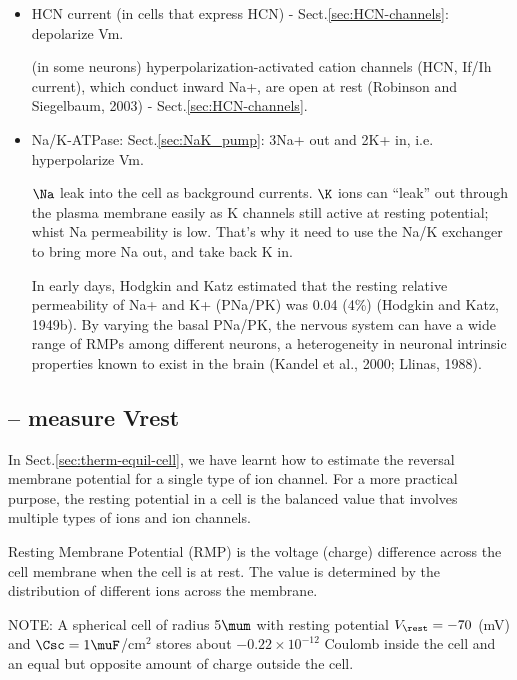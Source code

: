 \begin{itemize}
  \item HCN current (in cells that express HCN) - Sect.\ref{sec:HCN-channels}:
  depolarize Vm.

(in some neurons) hyperpolarization-activated cation channels (HCN,
If/Ih current), which conduct inward Na+, are open at rest (Robinson and
Siegelbaum, 2003) - Sect.\ref{sec:HCN-channels}.
  
  \item Na/K-ATPase: Sect.\ref{sec:NaK_pump}: 3Na+ out and 2K+ in, i.e.
  hyperpolarize Vm.

  
  $\Na$ leak into the cell as background currents. $\K$ ions can ``leak'' out
  through the plasma membrane easily as K channels still active at resting
  potential; whist Na permeability is low. That's why it need to use the Na/K
  exchanger to bring more Na  out, and take back K in.

In early days,  Hodgkin and Katz estimated that the resting relative
permeability of Na+ and K+ (PNa/PK) was 0.04 (4\%) (Hodgkin and Katz, 1949b).
By varying the basal PNa/PK, the nervous system can have a wide range of RMPs
among different neurons, a heterogeneity in neuronal intrinsic properties known
to exist in the brain (Kandel et al., 2000; Llinas, 1988).

\end{itemize}


\subsection{-- measure Vrest}

In Sect.\ref{sec:therm-equil-cell}, we have learnt how to estimate the reversal
membrane potential for a single type of ion channel. For a more practical
purpose, the resting potential in a cell is the balanced value that involves
multiple types of ions and ion channels.

Resting Membrane Potential (RMP) is the voltage (charge) difference across the
cell membrane when the cell is at rest. The value is determined by the
distribution of different ions across the membrane.

NOTE: A spherical cell of radius 5$\mum$ with resting potential $V_\rest = -70$
(mV) and $\Csc = 1\muF$/cm$^2$ stores about $-0.22\times 10^{-12}$ Coulomb
inside the cell and an equal but opposite amount of charge outside the cell.



